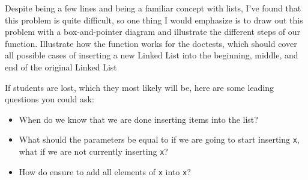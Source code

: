 \begin{questionmeta}
    Despite being a few lines and being a familiar concept with lists, I've found that this problem is quite difficult, so one thing I would emphasize is to draw out this problem with a box-and-pointer diagram and illustrate the different steps of our function. Illustrate how the function works for the doctests, which should cover all possible cases of inserting a new Linked List into the beginning, middle, and end of the original Linked List
    
    If students are lost, which they most likely will be, here are some leading questions you could ask: 
    \begin{itemize}
        \item When do we know that we are done inserting items into the list?
        \item What should the parameters be equal to if we are going to start inserting \lstinline{x}, what if we are not currently inserting \lstinline{x}?
        \item How do ensure to add all elements of \lstinline{x} into \lstinline{x}?
    \end{itemize}
    
    \end{questionmeta}
    
    